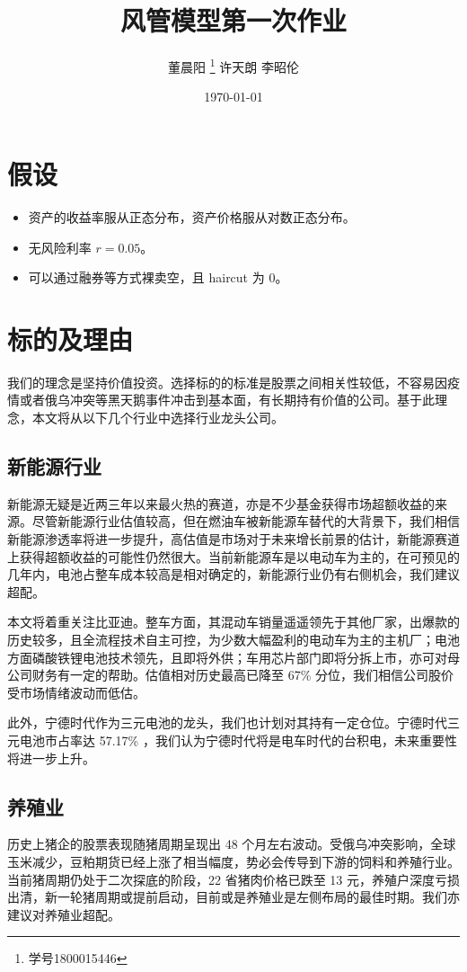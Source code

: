 \documentclass[a4paper,12pt]{ctexart}
\author{董晨阳 \thanks{学号1800015446} 许天朗 李昭伦}
\date{\today}
\title{风管模型第一次作业}
\begin{document}
\maketitle
\section{假设}
\label{sec:org5da1f3c}
\begin{itemize}
\item 资产的收益率服从正态分布，资产价格服从对数正态分布。
\item 无风险利率 \(r=0.05\)。
\item 可以通过融券等方式裸卖空，且 haircut 为 0。
\end{itemize}
\section{标的及理由}
\label{sec:orgfdcebd3}
我们的理念是坚持价值投资。选择标的的标准是股票之间相关性较低，不容易因疫情或者俄乌冲突等黑天鹅事件冲击到基本面，有长期持有价值的公司。基于此理念，本文将从以下几个行业中选择行业龙头公司。
\subsection{新能源行业}
\label{sec:org9a2787e}
新能源无疑是近两三年以来最火热的赛道，亦是不少基金获得市场超额收益的来源。尽管新能源行业估值较高，但在燃油车被新能源车替代的大背景下，我们相信新能源渗透率将进一步提升，高估值是市场对于未来增长前景的估计，新能源赛道上获得超额收益的可能性仍然很大。当前新能源车是以电动车为主的，在可预见的几年内，电池占整车成本较高是相对确定的，新能源行业仍有右侧机会，我们建议超配。

本文将着重关注比亚迪。整车方面，其混动车销量遥遥领先于其他厂家，出爆款的历史较多，且全流程技术自主可控，为少数大幅盈利的电动车为主的主机厂；电池方面磷酸铁锂电池技术领先，且即将外供；车用芯片部门即将分拆上市，亦可对母公司财务有一定的帮助。估值相对历史最高已降至 67\% 分位，我们相信公司股价受市场情绪波动而低估。

此外，宁德时代作为三元电池的龙头，我们也计划对其持有一定仓位。宁德时代三元电池市占率达 57.17\% ，我们认为宁德时代将是电车时代的台积电，未来重要性将进一步上升。
\subsection{养殖业}
\label{sec:org87d469f}
历史上猪企的股票表现随猪周期呈现出 48 个月左右波动。受俄乌冲突影响，全球玉米减少，豆粕期货已经上涨了相当幅度，势必会传导到下游的饲料和养殖行业。当前猪周期仍处于二次探底的阶段，22 省猪肉价格已跌至 13 元，养殖户深度亏损出清，新一轮猪周期或提前启动，目前或是养殖业是左侧布局的最佳时期。我们亦建议对养殖业超配。
\end{document}
